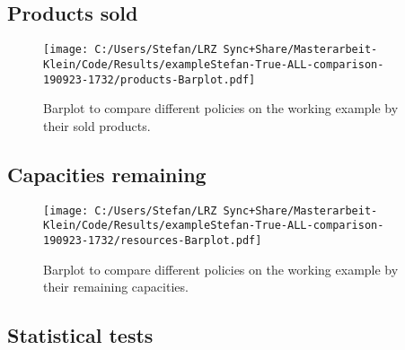 \subsection{Products sold}

\begin{figure}[!ht]
	\centering	
	\texttt{[image: C:/Users/Stefan/LRZ Sync+Share/Masterarbeit-Klein/Code/Results/exampleStefan-True-ALL-comparison-190923-1732/products-Barplot.pdf]}
	\caption[Barplot for comparison of working example - products.]{\label{fig-comp-work-prod}Barplot to compare different policies on the working example by their sold products.}
\end{figure}%

\subsection{Capacities remaining}

\begin{figure}[!ht]
	\centering	
	\texttt{[image: C:/Users/Stefan/LRZ Sync+Share/Masterarbeit-Klein/Code/Results/exampleStefan-True-ALL-comparison-190923-1732/resources-Barplot.pdf]}
	\caption[Barplot for comparison of working example - resources.]{\label{fig-comp-work-res}Barplot to compare different policies on the working example by their remaining capacities.}
\end{figure}%


\subsection{Statistical tests}